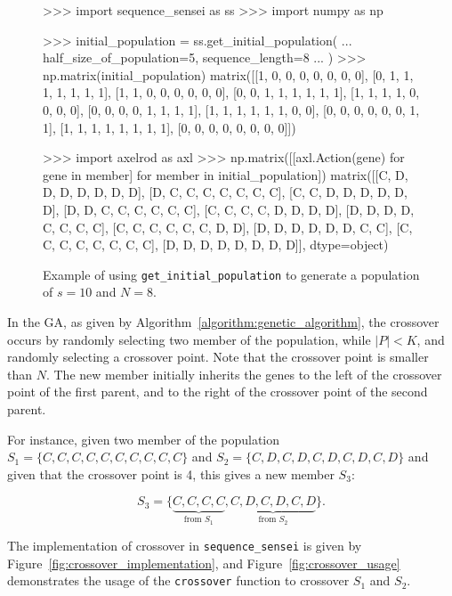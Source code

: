 \begin{figure}[!htbp]
    \begin{usagepy}
>>> import sequence_sensei as ss
>>> import numpy as np

>>> initial_population = ss.get_initial_population(
...     half_size_of_population=5, sequence_length=8
... )
>>> np.matrix(initial_population)
matrix([[1, 0, 0, 0, 0, 0, 0, 0],
        [0, 1, 1, 1, 1, 1, 1, 1],
        [1, 1, 0, 0, 0, 0, 0, 0],
        [0, 0, 1, 1, 1, 1, 1, 1],
        [1, 1, 1, 1, 0, 0, 0, 0],
        [0, 0, 0, 0, 1, 1, 1, 1],
        [1, 1, 1, 1, 1, 1, 0, 0],
        [0, 0, 0, 0, 0, 0, 1, 1],
        [1, 1, 1, 1, 1, 1, 1, 1],
        [0, 0, 0, 0, 0, 0, 0, 0]])

>>> import axelrod as axl
>>> np.matrix([[axl.Action(gene) for gene in member] for member in initial_population])
matrix([[C, D, D, D, D, D, D, D],
        [D, C, C, C, C, C, C, C],
        [C, C, D, D, D, D, D, D],
        [D, D, C, C, C, C, C, C],
        [C, C, C, C, D, D, D, D],
        [D, D, D, D, C, C, C, C],
        [C, C, C, C, C, C, D, D],
        [D, D, D, D, D, D, C, C],
        [C, C, C, C, C, C, C, C],
        [D, D, D, D, D, D, D, D]], dtype=object)

\end{usagepy}
\caption{Example of using \texttt{get_initial_population} to
generate a population of \(s=10\) and \(N=8\).}\label{fig:get_initial_population_example}
\end{figure}

In the GA, as given by Algorithm~\ref{algorithm:genetic_algorithm}, the
crossover occurs by randomly selecting two member of the population, while \(|P|
< K\), and randomly selecting a crossover point. Note that the crossover
point is smaller than \(N\). The new member initially inherits the
genes to the left of the crossover point of the first parent, and to the right
of the crossover point of the second parent.

For instance, given two member of the population \(S_1 = \{C, C, C, C, C, C, C, C, C, C\}\)
and \(S_2 = \{C, D, C, D, C, D, C, D, C, D\}\) and given that the crossover point is
4, this gives a new member \(S_3\):

\[S_3 = \{\underbrace{C, C, C, C}_{\text{from } S_1}, \underbrace{C, D, C, D, C, D}_{\text{from } S_2}\}.\]

The implementation of crossover in \texttt{sequence_sensei} is given
by Figure~\ref{fig:crossover_implementation}, and Figure~\ref{fig:crossover_usage}
demonstrates the usage of the \texttt{crossover} function to crossover
\(S_1\) and \(S_2\).

